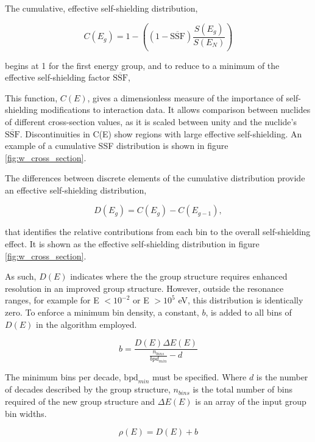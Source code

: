 The cumulative, effective self-shielding distribution,

\begin{equation}
\label{eq:c}
C(E_{g}) = 1 - \left( \left(1-\overline{\mathrm{SSF}}\right) \frac{S(E_{g})} {S(E_{N})}\right)
\end{equation}

begins at 1 for the first energy group, and to reduce to a minimum of the effective self-shielding factor $\overline{\mathrm{SSF}}$,

This function, $C(E)$, gives a dimensionless measure of the importance of self-shielding modifications to interaction data. It allows comparison between nuclides of different cross-section values, as it is scaled between unity and the nuclide's $\overline{\mathrm{SSF}}$. Discontinuities in C(E) show regions with large effective self-shielding. An example of a cumulative SSF distribution is shown in figure \ref{fig:w_cross_section}. 

The differences between discrete elements of the cumulative distribution provide an effective self-shielding distribution,

\begin{equation}
\label{eq:d}
D(E_{g}) = C(E_{g}) - C(E_{g-1}),
\end{equation}

that identifies the relative contributions from each bin to the overall self-shielding effect. It is shown as the effective self-shielding distribution in figure \ref{fig:w_cross_section}.

As such, $D(E)$ indicates where the the group structure requires enhanced resolution in an improved group structure. However, outside the resonance ranges, for example for E $< 10^{-2}$ or E $> 10^{5}$ eV, this distribution is identically zero. To enforce a minimum bin density, a constant, $b$, is added to all bins of $D(E)$ in the algorithm employed. 

\begin{equation}
\label{eq:b}
b = \frac{D(E) \Delta E(E)}{\frac{n_{bins}}{bpd_{min}} - d}
\end{equation}

The minimum bins per decade, $\mathrm{bpd}_{min}$ must be specified. Where $d$ is the number of decades described by the group structure, $n_{bins}$ is the total number of bins required of the new group structure and $\Delta E(E)$ is an array of the input group bin widths.

\begin{equation}
\label{eq:offset}
\rho(E) = D(E) + b
\end{equation}

